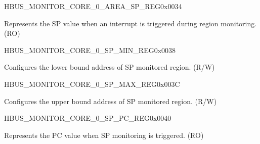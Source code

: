 \begin{register}{H}{BUS\_MONITOR\_CORE\_0\_AREA\_SP\_REG}{0x0034}\label{regdesc:BUSMONITORCORE0AREASPREG}
%
\regnewline%
\begin{regdesc}\begin{reglist}
\label{fielddesc:BUSMONITORCORE0AREASP}\item [BUS\_MONITOR\_CORE\_0\_AREA\_SP] Represents the SP value when an interrupt is triggered during region monitoring. (RO)
\end{reglist}\end{regdesc}
\end{register}


\begin{register}{H}{BUS\_MONITOR\_CORE\_0\_SP\_MIN\_REG}{0x0038}\label{regdesc:BUSMONITORCORE0SPMINREG}
%
\regnewline%
\begin{regdesc}\begin{reglist}
\label{fielddesc:BUSMONITORCORE0SPMIN}\item [BUS\_MONITOR\_CORE\_0\_SP\_MIN] Configures the lower bound address of SP monitored region. (R/W)
\end{reglist}\end{regdesc}
\end{register}


\begin{register}{H}{BUS\_MONITOR\_CORE\_0\_SP\_MAX\_REG}{0x003C}\label{regdesc:BUSMONITORCORE0SPMAXREG}
%
\regnewline%
\begin{regdesc}\begin{reglist}
\label{fielddesc:BUSMONITORCORE0SPMAX}\item [BUS\_MONITOR\_CORE\_0\_SP\_MAX] Configures the upper bound address of SP monitored region. (R/W)
\end{reglist}\end{regdesc}
\end{register}


\begin{register}{H}{BUS\_MONITOR\_CORE\_0\_SP\_PC\_REG}{0x0040}\label{regdesc:BUSMONITORCORE0SPPCREG}
%
\regnewline%
\begin{regdesc}\begin{reglist}
\label{fielddesc:BUSMONITORCORE0SPPC}\item [BUS\_MONITOR\_CORE\_0\_SP\_PC] Represents the PC value when SP monitoring is triggered. (RO)
\end{reglist}\end{regdesc}
\end{register}


